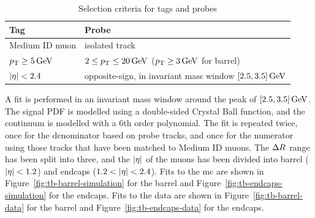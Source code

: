 \begin{table}[!htb]
	\centering
	
		\caption{\label{tab:tag-probe-def}Selection criteria for tags and probes}
			\begin{tabular}{l|l} \hline
			Tag & Probe \\ \hline
			Medium ID muon & isolated track\\
			$p_{\mathrm{T}} \geq 5\,\text{Ge\hspace{-.08em}V}$ & $2\leq p_{\mathrm{T}}\leq 20\,\text{Ge\hspace{-.08em}V}$  ($ p_{\mathrm{T}}\geq 3 \,\text{Ge\hspace{-.08em}V} $ for barrel) \\
			$\abs{\eta}<2.4$ & opposite-sign, in invariant mass window $[2.5,3.5]\,\text{Ge\hspace{-.08em}V}$ \\ \hline
			\end{tabular}
\end{table}

A fit is performed in an invariant mass window around the \JPsi peak of $[2.5,3.5]\,\text{Ge\hspace{-.08em}V}$. The signal PDF is modelled using a double-sided Crystal Ball function, and the continuum is modelled with a 6th order polynomial. The fit is repeated twice, once for the denominator based on probe tracks, and once for the numerator using those tracks that have been matched to Medium ID muons. The $\Delta R$ range has been split into three, and the $\abs{\eta}$ of the muons has been divided into barrel ($\abs{\eta}<1.2$) and endcaps ($1.2<\abs{\eta}<2.4$). Fits to the \gls{mc} are shown in Figure~\ref{fig:tb-barrel-simulation} for the barrel and Figure~\ref{fig:tb-endcaps-simulation} for the endcaps. Fits to the data are shown in Figure~\ref{fig:tb-barrel-data} for the barrel and Figure~\ref{fig:tb-endcaps-data} for the endcaps.

